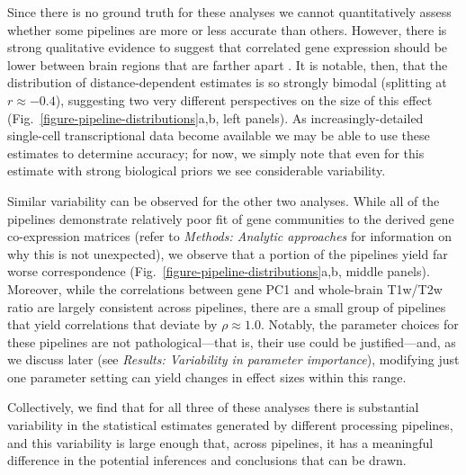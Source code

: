 \documentclass[12pt,aps,pra,reprint,showkeys]{revtex4-1}
\begin{document}
Since there is no ground truth for these analyses we cannot quantitatively assess whether some pipelines are more or less accurate than others.
However, there is strong qualitative evidence to suggest that correlated gene expression should be lower between brain regions that are farther apart \citep{arnatkeviciute2019neuroimage, krienen2016pnas, richiardi2015science, fulcher2019pnas, lau2021neuroimage}.
It is notable, then, that the distribution of distance-dependent estimates is so strongly bimodal (splitting at $r \approx -0.4$), suggesting two very different perspectives on the size of this effect (Fig.~\ref{figure-pipeline-distributions}a,b, left panels).
As increasingly-detailed single-cell transcriptional data become available \citep[e.g.,][]{yao2021cell} we may be able to use these estimates to determine accuracy; for now, we simply note that even for this estimate with strong biological priors we see considerable variability.

Similar variability can be observed for the other two analyses.
While all of the pipelines demonstrate relatively poor fit of gene communities to the derived gene co-expression matrices (refer to \emph{Methods: Analytic approaches} for information on why this is not unexpected), we observe that a portion of the pipelines yield far worse correspondence (Fig.~\ref{figure-pipeline-distributions}a,b, middle panels).
Moreover, while the correlations between gene PC1 and whole-brain T1w/T2w ratio are largely consistent across pipelines, there are a small group of pipelines that yield correlations that deviate by $\rho \approx 1.0$.
Notably, the parameter choices for these pipelines are not pathological---that is, their use could be justified---and, as we discuss later (see \emph{Results: Variability in parameter importance}), modifying just one parameter setting can yield changes in effect sizes within this range.

Collectively, we find that for all three of these analyses there is substantial variability in the statistical estimates generated by different processing pipelines, and this variability is large enough that, across pipelines, it has a meaningful difference in the potential inferences and conclusions that can be drawn.
\end{document}
